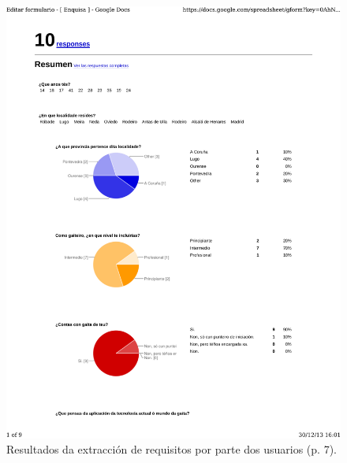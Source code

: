   \begin{figure}[htbp]
   \centering
   \includegraphics[scale=0.7,page=7,keepaspectratio=true]{./imagenes/enquisa.pdf}
   \caption{Resultados da extracción de requisitos por parte dos usuarios (p. 7).}
   \label{figura:ResultadosExtraccionRequisitosUsuarios7}
  \end{figure}


